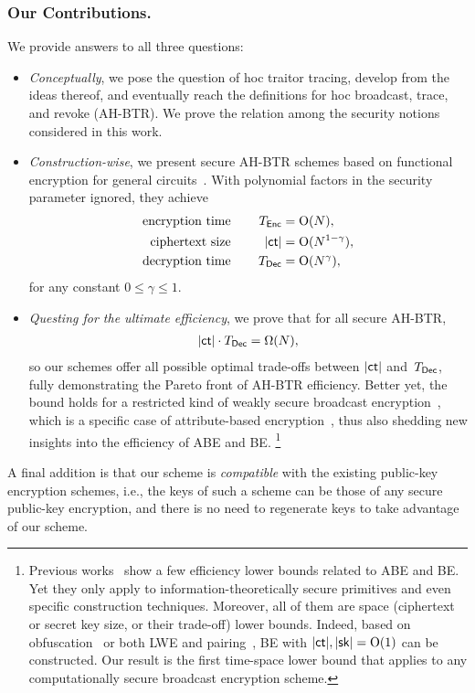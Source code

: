 \subsubsection{Our Contributions.}
We provide answers to all three questions:
\begin{itemize}
\item \emph{Conceptually}, we pose the question of \ad hoc traitor tracing,
develop from the ideas thereof, and
eventually reach the definitions for \ad hoc broadcast, trace, and revoke (AH-BTR).
We prove the relation among the security notions considered in this work.
\item \emph{Construction-wise},
we present secure AH-BTR schemes based on functional encryption for general circuits~\cite{TCC:BonSahWat11}.
With polynomial factors in the security parameter ignored,
they achieve
\begin{align*}
\textup{encryption time}\qquad\qquad\mathllap{T_\Enc}&{}=\bigO(N),\\
\textup{ciphertext size}\qquad\qquad\mathllap{|\ct|}&{}=\bigO(N^{1-\gamma}),\\
\textup{decryption time}\qquad\qquad\mathllap{T_\Dec}&{}=\bigO(N^\gamma),
\end{align*}
for any constant ${0\leq\gamma\leq 1}$.
\item \emph{Questing for the ultimate efficiency},
we prove that for all secure AH-BTR,
\begin{align*}
|\ct|\cdot\TDec=\bigOmega(N),
\end{align*}
so our schemes offer all possible optimal trade-offs between $|\ct|$ and~$\TDec$,
fully demonstrating the Pareto front of AH-BTR efficiency.
Better yet, the bound holds for a restricted kind of weakly secure broadcast encryption~\cite{C:FiaNao93},
which is a specific case of attribute-based encryption~\cite{EC:SahWat05,CCS:GPSW06},
thus also shedding new insights into the efficiency of ABE and BE.%
\footnote{Previous works~\cite{EC:BluCre94,EC:LubSta98,AC:KYDB98,AFRICACRYPT:AusKre08,AC:KatYer09,C:GayKerWee15,ITC:DLY21} show a few efficiency lower bounds related to ABE and BE.
Yet they only apply to information-theoretically secure primitives and even specific construction techniques.
Moreover, all of them are space (ciphertext or secret key size, or their trade-off) lower bounds.
Indeed, based on obfuscation~\cite{C:BonWatZha14} or both LWE and pairing~\cite{EC:AgrYam20}, BE with ${|\ct|,|\sk|=\bigO(1)}$ can be constructed.
Our result is the first time-space lower bound that applies to any computationally secure broadcast encryption scheme.}
\end{itemize}
A final addition is that our scheme is \emph{compatible} with the existing public-key encryption schemes,
i.e., the keys of such a scheme can be those of any secure public-key encryption, and
there is no need to regenerate keys to take advantage of our scheme.
